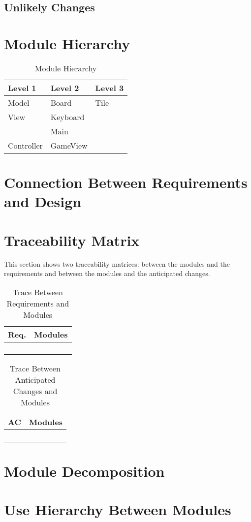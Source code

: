 \documentclass[12pt]{article}
\begin{document}
\subsection{Unlikely Changes}

\section{Module Hierarchy}
\begin{table}[!htbp]
	\centering
	\begin{tabular}{p{4cm}|p{4cm}|p{4cm}}
		\textbf{Level 1} & \textbf{Level 2} & \textbf{Level 3} \\\hline
		Model & Board & Tile \\\hline
		View & Keyboard &  \\
		& Main &  \\\hline
		Controller & GameView & \\
	\end{tabular}
	\smallskip
	\caption{Module Hierarchy}
	\label{Module Hierarchy}
\end{table}

\section{Connection Between Requirements and Design}

\section{Traceability Matrix}
This section shows two traceability matrices: between the modules and 
the 
requirements and between the modules and the anticipated changes. 
\smallskip
\begin{table}[!htbp]
	\centering
	\begin{tabular}{p{3cm}|p{9cm}}
		\textbf{Req.} & \textbf{Modules} \\\hline
		&  \\
		&  \\
		&  \\
		&  \\\hline
	\end{tabular}
	\caption{Trace Between Requirements and Modules}
	\label{Trace Between Requirements and Modules}
\end{table}
\begin{table}[!htbp]
	\centering
	\begin{tabular}{p{3cm}|p{9cm}}
		\textbf{AC} & \textbf{Modules} \\\hline
		&  \\
		&  \\
		&  \\
		&  \\\hline
	\end{tabular}
	\caption{Trace Between Anticipated Changes and Modules}
	\label{Trace Between Anticipated Changes and Modules}
\end{table}

\section{Module Decomposition}

\section{Use Hierarchy Between Modules}
\end{document}
